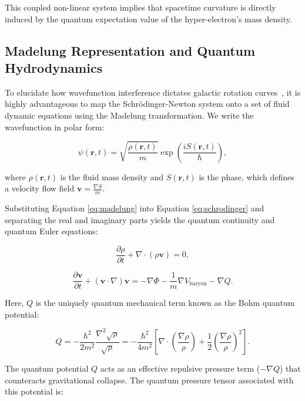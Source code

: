 This coupled non-linear system implies that spacetime curvature is directly induced by the quantum expectation value of the hyper-electron's mass density.

\subsection{Madelung Representation and Quantum Hydrodynamics}

To elucidate how wavefunction interference dictates galactic rotation curves~\cite{Navarro1996}, it is highly advantageous to map the Schrödinger-Newton system onto a set of fluid dynamic equations using the Madelung transformation. We write the wavefunction in polar form:

\begin{equation}
\psi(\mathbf{r},t) = \sqrt{\frac{\rho(\mathbf{r},t)}{m}} \exp\left( \frac{i S(\mathbf{r},t)}{\hbar} \right),
\label{eq:madelung}
\end{equation}

where $\rho(\mathbf{r},t)$ is the fluid mass density and $S(\mathbf{r},t)$ is the phase, which defines a velocity flow field $\mathbf{v} = \frac{\nabla S}{m}$.

Substituting Equation \ref{eq:madelung} into Equation \ref{eq:schrodinger} and separating the real and imaginary parts yields the quantum continuity and quantum Euler equations:

\begin{equation}
\frac{\partial \rho}{\partial t} + \nabla \cdot (\rho \mathbf{v}) = 0,
\label{eq:continuity}
\end{equation}

\begin{equation}
\frac{\partial \mathbf{v}}{\partial t} + (\mathbf{v} \cdot \nabla)\mathbf{v} = -\nabla \Phi - \frac{1}{m}\nabla V_{\text{baryon}} - \nabla Q.
\label{eq:euler}
\end{equation}

Here, $Q$ is the uniquely quantum mechanical term known as the Bohm quantum potential:

\begin{equation}
Q = -\frac{\hbar^2}{2m^2} \frac{\nabla^2 \sqrt{\rho}}{\sqrt{\rho}} = -\frac{\hbar^2}{4m^2} \left[ \nabla \cdot \left(\frac{\nabla \rho}{\rho}\right) + \frac{1}{2} \left(\frac{\nabla \rho}{\rho}\right)^2 \right].
\label{eq:quantum_potential}
\end{equation}

The quantum potential $Q$ acts as an effective repulsive pressure term ($-\nabla Q$) that counteracts gravitational collapse. The quantum pressure tensor associated with this potential is:

